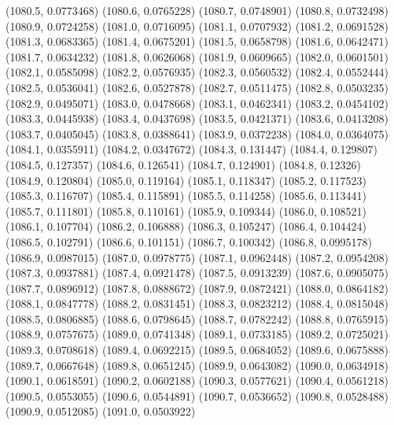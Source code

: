 {					(1080.5, 0.0773468)
					(1080.6, 0.0765228)
					(1080.7, 0.0748901)
					(1080.8, 0.0732498)
					(1080.9, 0.0724258)
					(1081.0, 0.0716095)
					(1081.1, 0.0707932)
					(1081.2, 0.0691528)
					(1081.3, 0.0683365)
					(1081.4, 0.0675201)
					(1081.5, 0.0658798)
					(1081.6, 0.0642471)
					(1081.7, 0.0634232)
					(1081.8, 0.0626068)
					(1081.9, 0.0609665)
					(1082.0, 0.0601501)
					(1082.1, 0.0585098)
					(1082.2, 0.0576935)
					(1082.3, 0.0560532)
					(1082.4, 0.0552444)
					(1082.5, 0.0536041)
					(1082.6, 0.0527878)
					(1082.7, 0.0511475)
					(1082.8, 0.0503235)
					(1082.9, 0.0495071)
					(1083.0, 0.0478668)
					(1083.1, 0.0462341)
					(1083.2, 0.0454102)
					(1083.3, 0.0445938)
					(1083.4, 0.0437698)
					(1083.5, 0.0421371)
					(1083.6, 0.0413208)
					(1083.7, 0.0405045)
					(1083.8, 0.0388641)
					(1083.9, 0.0372238)
					(1084.0, 0.0364075)
					(1084.1, 0.0355911)
					(1084.2, 0.0347672)
					(1084.3, 0.131447)
					(1084.4, 0.129807)
					(1084.5, 0.127357)
					(1084.6, 0.126541)
					(1084.7, 0.124901)
					(1084.8, 0.12326)
					(1084.9, 0.120804)
					(1085.0, 0.119164)
					(1085.1, 0.118347)
					(1085.2, 0.117523)
					(1085.3, 0.116707)
					(1085.4, 0.115891)
					(1085.5, 0.114258)
					(1085.6, 0.113441)
					(1085.7, 0.111801)
					(1085.8, 0.110161)
					(1085.9, 0.109344)
					(1086.0, 0.108521)
					(1086.1, 0.107704)
					(1086.2, 0.106888)
					(1086.3, 0.105247)
					(1086.4, 0.104424)
					(1086.5, 0.102791)
					(1086.6, 0.101151)
					(1086.7, 0.100342)
					(1086.8, 0.0995178)
					(1086.9, 0.0987015)
					(1087.0, 0.0978775)
					(1087.1, 0.0962448)
					(1087.2, 0.0954208)
					(1087.3, 0.0937881)
					(1087.4, 0.0921478)
					(1087.5, 0.0913239)
					(1087.6, 0.0905075)
					(1087.7, 0.0896912)
					(1087.8, 0.0888672)
					(1087.9, 0.0872421)
					(1088.0, 0.0864182)
					(1088.1, 0.0847778)
					(1088.2, 0.0831451)
					(1088.3, 0.0823212)
					(1088.4, 0.0815048)
					(1088.5, 0.0806885)
					(1088.6, 0.0798645)
					(1088.7, 0.0782242)
					(1088.8, 0.0765915)
					(1088.9, 0.0757675)
					(1089.0, 0.0741348)
					(1089.1, 0.0733185)
					(1089.2, 0.0725021)
					(1089.3, 0.0708618)
					(1089.4, 0.0692215)
					(1089.5, 0.0684052)
					(1089.6, 0.0675888)
					(1089.7, 0.0667648)
					(1089.8, 0.0651245)
					(1089.9, 0.0643082)
					(1090.0, 0.0634918)
					(1090.1, 0.0618591)
					(1090.2, 0.0602188)
					(1090.3, 0.0577621)
					(1090.4, 0.0561218)
					(1090.5, 0.0553055)
					(1090.6, 0.0544891)
					(1090.7, 0.0536652)
					(1090.8, 0.0528488)
					(1090.9, 0.0512085)
					(1091.0, 0.0503922)
}
